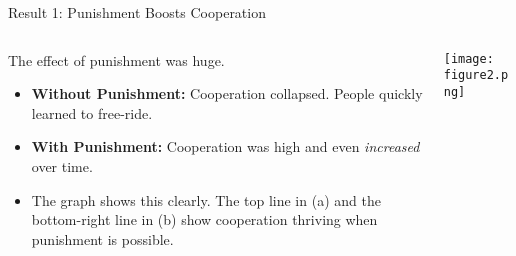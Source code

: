 \documentclass{beamer}
\begin{document}
\begin{frame}{Result 1: Punishment Boosts Cooperation}
    \begin{columns}[c]
        \begin{column}{.5\textwidth}
            The effect of punishment was huge.
            \begin{itemize}
                \item<1-> \textbf{Without Punishment:} Cooperation collapsed. People quickly learned to free-ride.
                \pause
                \item<2-> \textbf{With Punishment:} Cooperation was high and even \textit{increased} over time.
                \pause
                \item<3-> The graph shows this clearly. The top line in (a) and the bottom-right line in (b) show cooperation thriving when punishment is possible.
            \end{itemize}
        \end{column}
        \begin{column}{.5\textwidth}
            \begin{center}
            \texttt{[image: figure2.png]}
            \end{center}
        \end{column}
    \end{columns}
\end{frame}
\end{document}
